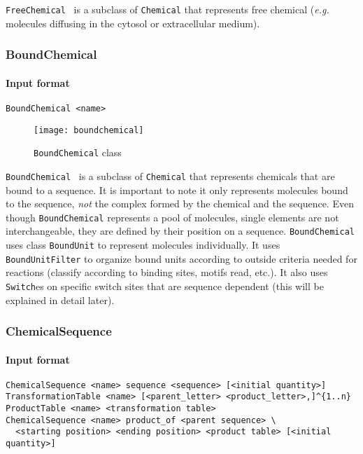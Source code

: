 \texttt{FreeChemical}~ is a subclass of \texttt{Chemical} that represents free chemical (\textit{e.g.} molecules diffusing in the cytosol or extracellular medium).

\subsubsection{BoundChemical}

\paragraph{Input format}
\begin{verbatim}
BoundChemical <name>
\end{verbatim}

\begin{figure}[!h]
  \centering
  \texttt{[image: boundchemical]}
  \caption{\texttt{BoundChemical} class}
  \label{fig:bound_chemical}
\end{figure}

\texttt{BoundChemical}~ is a subclass of \texttt{Chemical} that represents chemicals that are bound to a sequence. It is important to note it only represents molecules bound to the sequence, \emph{not} the complex formed by the chemical and the sequence. Even though \texttt{BoundChemical} represents a pool of molecules, single elements are not interchangeable, they are defined by their position on a sequence. \texttt{BoundChemical} uses class \texttt{BoundUnit} to represent molecules individually. It uses \texttt{BoundUnitFilter} to organize bound units according to outside criteria needed for reactions (classify according to binding sites, motifs read, etc.). It also uses \texttt{Switch}es on specific switch sites that are sequence dependent (this will be explained in detail later).

\subsubsection{ChemicalSequence}

\paragraph{Input format}
\begin{verbatim}
ChemicalSequence <name> sequence <sequence> [<initial quantity>]
TransformationTable <name> [<parent_letter> <product_letter>,]^{1..n}
ProductTable <name> <transformation table>
ChemicalSequence <name> product_of <parent sequence> \
  <starting position> <ending position> <product table> [<initial quantity>]
\end{verbatim}

